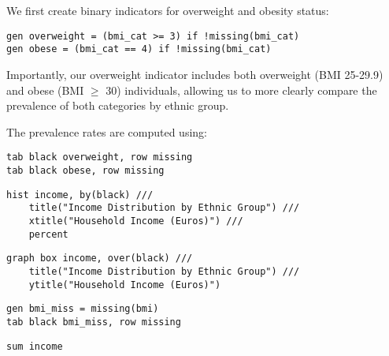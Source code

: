 We first create binary indicators for overweight and obesity status:

\begin{verbatim}
gen overweight = (bmi_cat >= 3) if !missing(bmi_cat)
gen obese = (bmi_cat == 4) if !missing(bmi_cat)
\end{verbatim}

Importantly, our overweight indicator includes both overweight (BMI 25-29.9) and obese (BMI $\geq$ 30) individuals, allowing us to more clearly compare the prevalence of both categories by ethnic group.

The prevalence rates are computed using:

\begin{verbatim}
tab black overweight, row missing
tab black obese, row missing
\end{verbatim}




\begin{verbatim}
hist income, by(black) ///
    title("Income Distribution by Ethnic Group") ///
    xtitle("Household Income (Euros)") ///
    percent    
\end{verbatim}

\begin{verbatim}
graph box income, over(black) ///
	title("Income Distribution by Ethnic Group") ///
	ytitle("Household Income (Euros)")
\end{verbatim}


\begin{verbatim}
gen bmi_miss = missing(bmi)
tab black bmi_miss, row missing
\end{verbatim}


\begin{verbatim}
sum income
\end{verbatim}